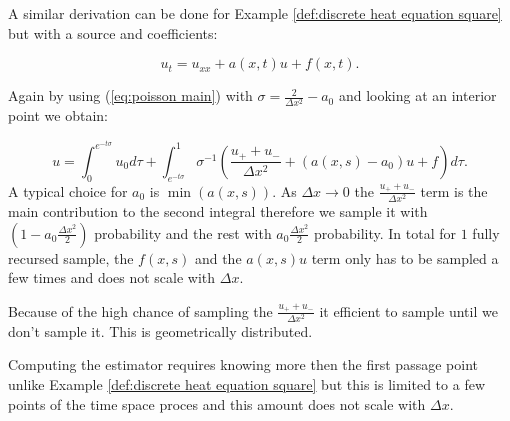 \documentclass[a4paper,12pt]{article}
\begin{document}
\begin{example} \label{ex:semi heat source}

  A similar derivation can be done for Example \ref{def:discrete heat equation square}
  but with a source and coefficients:

  \begin{equation}
    u_{t} = u_{xx} + a(x,t)u + f(x,t)
    .
  \end{equation}

  Again by using (\ref{eq:poisson main}) with $\sigma = \frac{2}{\Delta x^{2}} -a_{0}$
  and looking at an interior point we obtain:

  \begin{equation}
    u =
    \int_{0}^{e^{-t \sigma }} u_{0} d\tau  + \int_{e^{-t \sigma }}^{1}
    \sigma^{-1}
    \left(
    \frac{u_{+} + u_{-}}{\Delta x^{2}} +(a(x,s)- a_{0}) u+ f
    \right)
    d\tau
    .
  \end{equation}
  A typical choice for $a_{0} $ is $\min (a(x,s))$. As $\Delta x \rightarrow 0$ the $\frac{u_{+} + u_{-}}{\Delta x^{2}}$ term is
  the main contribution to the second integral therefore we sample it with $(1 - a_{0} \frac{\Delta x^2}{2})$ probability and
  the rest with $a_{0} \frac{\Delta x^2}{2}$ probability. In total for $1$ fully recursed sample,
  the $f(x,s)$ and the $a(x,s)u$ term only
  has to be sampled a few times and does not scale with $\Delta x$.

\end{example}

\begin{julia}\label{jl:point estimator heat source}
  Because of the high chance of sampling the $\frac{u_{+} + u_{-}}{\Delta x^{2}}$ it efficient
  to sample until we don't sample it. This is geometrically distributed.

\end{julia}

Computing the estimator requires knowing more then the first passage point
unlike Example \ref{def:discrete heat equation square} but this is limited
to a few points of the time space proces and this amount does not scale with $\Delta x$.
\end{document}

